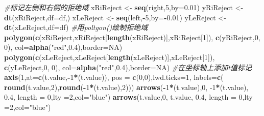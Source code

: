 \documentclass[
]{article}
\newenvironment{Shaded}{\begin{snugshade}}{\end{snugshade}}
\newcommand{\CommentTok}[1]{\textcolor[rgb]{0.56,0.35,0.01}{\textit{#1}}}
\newcommand{\DataTypeTok}[1]{\textcolor[rgb]{0.13,0.29,0.53}{#1}}
\newcommand{\DecValTok}[1]{\textcolor[rgb]{0.00,0.00,0.81}{#1}}
\newcommand{\FloatTok}[1]{\textcolor[rgb]{0.00,0.00,0.81}{#1}}
\newcommand{\KeywordTok}[1]{\textcolor[rgb]{0.13,0.29,0.53}{\textbf{#1}}}
\newcommand{\NormalTok}[1]{#1}
\newcommand{\OperatorTok}[1]{\textcolor[rgb]{0.81,0.36,0.00}{\textbf{#1}}}
\newcommand{\OtherTok}[1]{\textcolor[rgb]{0.56,0.35,0.01}{#1}}
\newcommand{\StringTok}[1]{\textcolor[rgb]{0.31,0.60,0.02}{#1}}
\begin{document}
\begin{Shaded}
\begin{Highlighting}[]
\CommentTok{#标记左侧和右侧的拒绝域}
\NormalTok{xRiReject <-}\StringTok{ }\KeywordTok{seq}\NormalTok{(right,}\DecValTok{5}\NormalTok{,}\DataTypeTok{by=}\FloatTok{0.01}\NormalTok{)}
\NormalTok{yRiReject <-}\StringTok{ }\KeywordTok{dt}\NormalTok{(xRiReject,}\DataTypeTok{df=}\NormalTok{df,)}
\NormalTok{xLeReject <-}\StringTok{ }\KeywordTok{seq}\NormalTok{(left,}\OperatorTok{-}\DecValTok{5}\NormalTok{,}\DataTypeTok{by=}\OperatorTok{-}\FloatTok{0.01}\NormalTok{)}
\NormalTok{yLeReject <-}\StringTok{ }\KeywordTok{dt}\NormalTok{(xLeReject,}\DataTypeTok{df=}\NormalTok{df)}
\CommentTok{#用poltgon()绘制拒绝域}
\KeywordTok{polygon}\NormalTok{(}\KeywordTok{c}\NormalTok{(xRiReject,xRiReject[}\KeywordTok{length}\NormalTok{(xRiReject)],xRiReject[}\DecValTok{1}\NormalTok{]),}
        \KeywordTok{c}\NormalTok{(yRiReject,}\DecValTok{0}\NormalTok{, }\DecValTok{0}\NormalTok{), }\DataTypeTok{col=}\KeywordTok{alpha}\NormalTok{(}\StringTok{"red"}\NormalTok{,}\FloatTok{0.4}\NormalTok{),}\DataTypeTok{border=}\OtherTok{NA}\NormalTok{)}
\KeywordTok{polygon}\NormalTok{(}\KeywordTok{c}\NormalTok{(xLeReject,xLeReject[}\KeywordTok{length}\NormalTok{(xLeReject)],xLeReject[}\DecValTok{1}\NormalTok{]),}
        \KeywordTok{c}\NormalTok{(yLeReject,}\DecValTok{0}\NormalTok{, }\DecValTok{0}\NormalTok{), }\DataTypeTok{col=}\KeywordTok{alpha}\NormalTok{(}\StringTok{"red"}\NormalTok{,}\FloatTok{0.4}\NormalTok{),}\DataTypeTok{border=}\OtherTok{NA}\NormalTok{)}
\CommentTok{#在坐标轴上添加t值标记}
\KeywordTok{axis}\NormalTok{(}\DecValTok{1}\NormalTok{,}\DataTypeTok{at=}\KeywordTok{c}\NormalTok{(t.value,}\OperatorTok{-}\DecValTok{1}\OperatorTok{*}\NormalTok{(t.value)),}
     \DataTypeTok{pos =} \KeywordTok{c}\NormalTok{(}\DecValTok{0}\NormalTok{,}\DecValTok{0}\NormalTok{),}\DataTypeTok{lwd.ticks=}\DecValTok{1}\NormalTok{,}
     \DataTypeTok{labels=}\KeywordTok{c}\NormalTok{( }\KeywordTok{round}\NormalTok{(t.value,}\DecValTok{2}\NormalTok{),}\KeywordTok{round}\NormalTok{(}\OperatorTok{-}\DecValTok{1}\OperatorTok{*}\NormalTok{(t.value),}\DecValTok{2}\NormalTok{)))}
\KeywordTok{arrows}\NormalTok{(}\OperatorTok{-}\DecValTok{1}\OperatorTok{*}\NormalTok{(t.value),}\DecValTok{0}\NormalTok{, }\DecValTok{-1}\OperatorTok{*}\NormalTok{(t.value), }\FloatTok{0.4}\NormalTok{, }\DataTypeTok{length =} \DecValTok{0}\NormalTok{,}\DataTypeTok{lty =}\DecValTok{2}\NormalTok{,}\DataTypeTok{col=}\StringTok{"blue"}\NormalTok{)}
\KeywordTok{arrows}\NormalTok{(t.value,}\DecValTok{0}\NormalTok{, t.value, }\FloatTok{0.4}\NormalTok{, }\DataTypeTok{length =} \DecValTok{0}\NormalTok{,}\DataTypeTok{lty =}\DecValTok{2}\NormalTok{,}\DataTypeTok{col=}\StringTok{"blue"}\NormalTok{)}
\end{Highlighting}
\end{Shaded}
\end{document}
